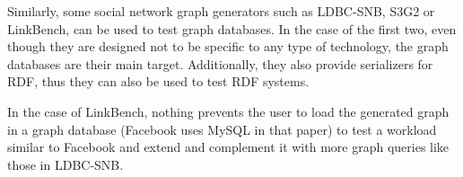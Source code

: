 Similarly, some social network graph generators such as LDBC-SNB, S3G2 or
LinkBench, can be used to test graph databases. In the case of the first two,
even though they are designed not to be specific to any type of technology,
the graph databases are their main target.  Additionally, they also provide serializers for
RDF, thus they can also be used to test RDF systems.

In the case of LinkBench, nothing prevents the user to load the generated graph
in a graph database (Facebook uses MySQL in that paper) to
test a workload similar to Facebook and extend and complement it with more
graph queries like those in LDBC-SNB.
